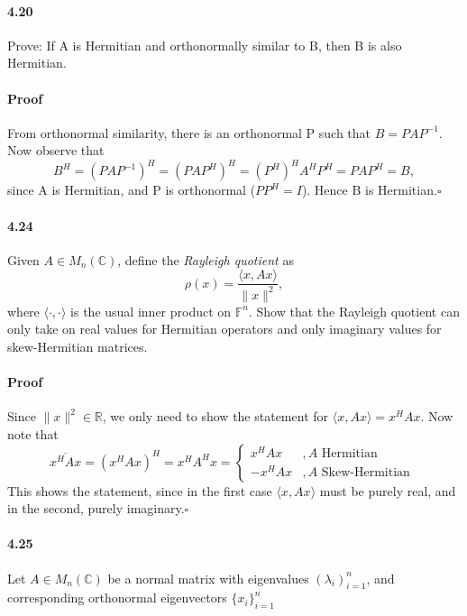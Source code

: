 \documentclass[letterpaper,12pt]{article}
\theoremstyle{definition}
\begin{document}
\paragraph{4.20} Prove: If A is Hermitian and orthonormally similar to B, then B is also Hermitian.

\paragraph{Proof} From orthonormal similarity, there is an orthonormal P such that $ B = P A P^{-1} $. Now observe that $$ B^H = (P A P^{-1})^H = (P A P^H)^H = (P^H)^H A^H P^H = P A P^H = B,$$ since A is Hermitian, and P is orthonormal ($PP^H = I$). Hence B is Hermitian.$\square$
   
   
\paragraph{4.24} Given $A \in M_n(\mathbb{C})$, define the \emph{Rayleigh quotient} as 
$$ \rho(x) = \frac{\langle x, Ax \rangle}{\|x\|^2},$$
where  $\langle \cdot, \cdot \rangle$ is the usual inner product on $\mathbb{F}^n$. Show that the Rayleigh quotient can only take on real values for Hermitian operators and only imaginary values for skew-Hermitian matrices.

\paragraph{Proof} Since $\|x\|^2 \in \mathbb R$, we only need to show the statement for  $ \langle x, Ax \rangle = x^H A x$. Now note that $$\overline{x^H A x} = (x^H A x)^H = x^H A^H x =
\begin{cases}
x^H A x &, A \text{ Hermitian } \\
- x^H A x &, A \text{ Skew-Hermitian } 
\end{cases}$$
This shows the statement, since in the first case $ \langle x, Ax \rangle$ must be purely real, and in the second, purely imaginary.$\square$

\paragraph{4.25} Let $A \in M_n(\mathbb{C})$ be a normal matrix with eigenvalues $(\lambda_i)_{i = 1}^n$, and corresponding orthonormal eigenvectors  $\{x_i\}_{i = 1}^n$
\end{document}
